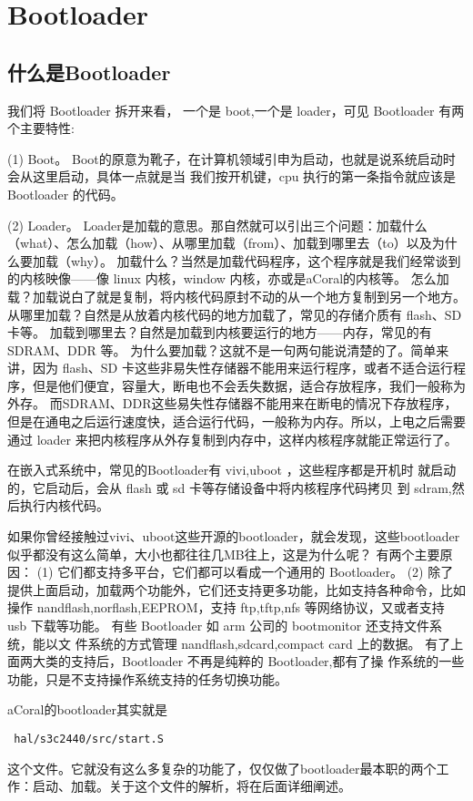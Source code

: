 \chapter{Bootloader}
\section{什么是Bootloader}
我们将 Bootloader 拆开来看，
一个是 boot,一个是 loader，可见 Bootloader 有两个主要特性:

(1) Boot。
Boot的原意为靴子，在计算机领域引申为启动，也就是说系统启动时会从这里启动，具体一点就是当
我们按开机键，cpu 执行的第一条指令就应该是 Bootloader 的代码。

(2) Loader。
Loader是加载的意思。那自然就可以引出三个问题：加载什么（what）、怎么加载（how）、从哪里加载（from）、加载到哪里去（to）以及为什么要加载（why）。
加载什么？当然是加载代码程序，这个程序就是我们经常谈到的内核映像——像 linux 内核，window 内核，亦或是aCoral的内核等。
怎么加载？加载说白了就是复制，将内核代码原封不动的从一个地方复制到另一个地方。
从哪里加载？自然是从放着内核代码的地方加载了，常见的存储介质有 flash、SD 卡等。
加载到哪里去？自然是加载到内核要运行的地方——内存，常见的有 SDRAM、DDR 等。
为什么要加载？这就不是一句两句能说清楚的了。简单来讲，因为 flash、SD 卡这些非易失性存储器不能用来运行程序，或者不适合运行程序，但是他们便宜，容量大，断电也不会丢失数据，适合存放程序，我们一般称为外存。
而SDRAM、DDR这些易失性存储器不能用来在断电的情况下存放程序，但是在通电之后运行速度快，适合运行代码，一般称为内存。所以，上电之后需要通过 loader 来把内核程序从外存复制到内存中，这样内核程序就能正常运行了。

在嵌入式系统中，常见的Bootloader有 vivi,uboot ，这些程序都是开机时
就启动的，它启动后，会从 flash 或 sd 卡等存储设备中将内核程序代码拷贝
到 sdram,然后执行内核代码。

如果你曾经接触过vivi、uboot这些开源的bootloader，就会发现，这些bootloader似乎都没有这么简单，大小也都往往几MB往上，这是为什么呢？
有两个主要原因：
(1) 它们都支持多平台，它们都可以看成一个通用的 Bootloader。
(2) 除了提供上面启动，加载两个功能外，它们还支持更多功能，比如支持各种命令，比如操作 nandflash,norflash,EEPROM，支持 ftp,tftp,nfs 等网络协议，又或者支持 usb 下载等功能。
有些 Bootloader 如 arm 公司的 bootmonitor 还支持文件系统，能以文
件系统的方式管理 nandflash,sdcard,compact card 上的数据。
有了上面两大类的支持后，Bootloader 不再是纯粹的 Bootloader,都有了操
作系统的一些功能，只是不支持操作系统支持的任务切换功能。

aCoral的bootloader其实就是 
\begin{lstlisting}
 hal/s3c2440/src/start.S 
\end{lstlisting}
这个文件。它就没有这么多复杂的功能了，仅仅做了bootloader最本职的两个工作：启动、加载。关于这个文件的解析，将在后面详细阐述。


